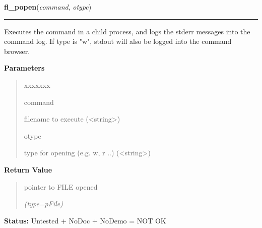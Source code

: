 \hspace{.8\funcindent}\begin{boxedminipage}{\funcwidth}

    \raggedright \textbf{fl\_popen}(\textit{command}, \textit{otype})

    \vspace{-1.5ex}

    \rule{\textwidth}{0.5\fboxrule}
\setlength{\parskip}{2ex}
    Executes the command in a child process, and logs the stderr messages 
    into the command log. If type is "w", stdout will also be logged into 
    the command browser.

\setlength{\parskip}{1ex}
      \textbf{Parameters}
      \vspace{-1ex}

      \begin{quote}
        \begin{Ventry}{xxxxxxx}

          \item[command]

          filename to execute ({\textless}string{\textgreater})

          \item[otype]

          type for opening (e.g. w, r ..) ({\textless}string{\textgreater})

        \end{Ventry}

      \end{quote}

      \textbf{Return Value}
    \vspace{-1ex}

      \begin{quote}
      pointer to FILE opened

      {\it (type=pFile)}

      \end{quote}

\textbf{Status:} Untested + NoDoc + NoDemo = NOT OK



    \end{boxedminipage}

    \label{xformslib:library:fl_pclose}

    \vspace{0.5ex}


